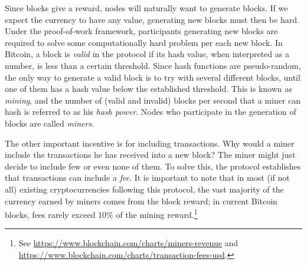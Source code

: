 Since blocks give a reward, nodes will naturally want to generate blocks. If we expect the currency to have any value, generating new blocks must then be hard. Under the proof-of-work framework, participants generating new blocks are required to solve some computationally hard problem per each new block. In Bitcoin, a block is \emph{valid} in the protocol if its hash value, when interpreted as a number, is less than a certain threshold. Since hash functions are pseudo-random,  the only way to generate a valid block is to try with several different blocks, until one of them has a hash value below the established threshold. This is known as \emph{mining}, and the number of (valid and invalid) blocks per second that a miner can hash is referred to as his \emph{hash power}. Nodes who participate in the generation of blocks %
are called \emph{miners}. 

\iffalse
Assume now that a miner generates a new valid block that points to the last block of the current blockchain. He/she will try to get this new block broadcast across the network as fast as possible, because this makes the branch of such block longer, encouraging other nodes to mine on top of this new block. If he/she keeps this block private, most likely other miners will generate a longer branch without his/her node, and the miner will not be able to place his/her block in the blockchain, missing the associated reward.
\fi

The other important incentive is for including transactions. Why would a miner include the transactions he has received into a new block? The miner might just decide to include few or even none of them. To solve this, the protocol establishes that transactions can include a \emph{fee}. %
It is important to note that in most (if not all) existing cryptocurrencies following this protocol, the vast majority of the currency earned by miners comes from the block reward; in current Bitcoin blocks, fees rarely exceed 10\% of the mining reward.\footnote{See  \url{https://www.blockchain.com/charts/miners-revenue} and \url{https://www.blockchain.com/charts/transaction-fees-usd}.}


